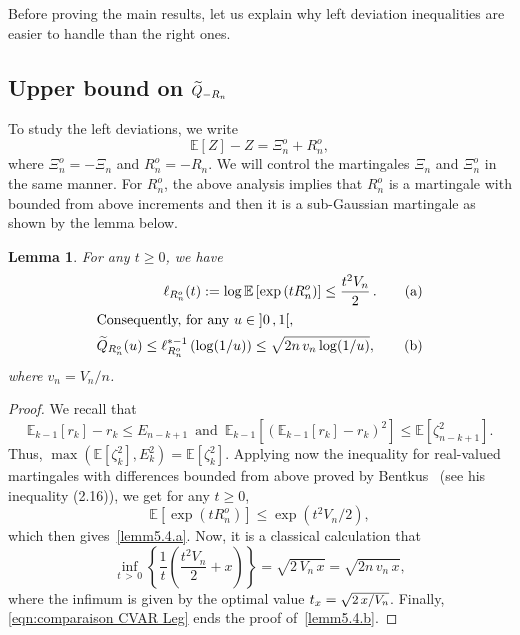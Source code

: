 \documentclass[10pt]{amsart}
\newtheorem{lemm}[theo]{Lemma}\newtheorem{prop}[theo]{Proposition}\newtheorem{coro}[theo]{Corollary}\newtheorem{conj}[theo]{Conjecture}
\theoremstyle{definition}\newtheorem{defi}[theo]{Definition}\newtheorem{rema}[theo]{Remark}\newtheorem{exam}[theo]{Example}\newtheorem{exem}[theo]{Example}\newtheorem{nota}[theo]{Notation}
\newcommand{\bE}{\mathbb{E}}
\newcommand{\intervalleoo}[2]{\mathopen{]} #1\mathclose{}\mathpunct{},#2\mathclose{[}}
\let\oldtilde\tilde
\renewcommand*{\tilde}[1]{\mathchoice{\widetilde{#1}}{\widetilde{#1}}{\oldtilde{#1}}{\oldtilde{#1}}}
\begin{document}
Before proving the main results, let us explain why left deviation inequalities are easier to handle than the right ones.

\subsection{Upper bound on \texorpdfstring{$\tilde Q_{-R_n}$}{}}

To study the left deviations, we write
\begin{equation}\label{eqn:decomposition martingale}
\bE[Z]-Z=\Xi_n^o +R_n^o,
\end{equation}
where $\Xi_n^o=-\Xi_n$ and $R_n^o=-R_n$. We will control the martingales $\Xi_n$ and $\Xi_n^o$ in the same manner. For $R_n^o$, the above analysis implies that $R_n^o$ is a martingale with bounded from above increments and then it is a sub-Gaussian martingale as shown by the lemma below.

\begin{lemm}\label{lem:bound log-laplace R_n}
For any $t\geq 0$, we have
\begin{align}
\ell_{R_n^o}(t):=\log\bE\left[\exp\left(tR_n^o\right)\right]\leq \frac{t^2V_n}{2}\,.\tag{$\rm a$}\label{lemm5.4.a}
\\
\intertext{Consequently, for any $u\in \intervalleoo 01$,}
\tilde Q_{R_n^o}(u)\leq \ell_{R_n^o}^{*-1}\left(\log(1/u)\right)\leq \sqrt{2n\,v_n\log(1/u)},\tag{$\rm b$}\label{lemm5.4.b}
\end{align}
where $v_n=V_n/n$.
\end{lemm}


\begin{proof}
We recall that
\begin{equation}\label{eqn:proof lemma R_n eqn1}
\bE_{k-1}[r_k]-r_k\leq E_{n-k+1}\,\text{ and }\, \bE_{k-1}\left[\left(\bE_{k-1}[r_k]-r_k\right)^2\right]\leq \bE\left[\zeta_{n-k+1}^2\right].
\end{equation}
Thus, $\max(\bE[\zeta_k^2],E_k^2)=\bE[\zeta_k^2]$. Applying now the inequality for real-valued martingales with differences bounded from above proved by Bentkus~\cite{Bentkus03} (see his inequality (2.16)), we get for any $t\geq 0$,
\begin{equation}\label{eqn:proof lemma R_n eqn3}
\bE\left[\exp\left(tR_n^o\right)\right]\leq \exp\left(t^2V_n/2\right),
\end{equation}
which then gives~\eqref{lemm5.4.a}. Now, it is a classical calculation that
\begin{equation}
\inf_{t\,>\,0}\left\{\frac 1t \left(\frac{t^2V_n}{2}+x\right)\right\}=\sqrt{2\,V_n\,x}=\sqrt{2n\,v_n\,x},
\end{equation}
where the infimum is given by the optimal value $t_x=\sqrt{\text{\small{$2\,x/V_n$}}}$. Finally, \eqref{eqn:comparaison CVAR Leg} ends the proof of~\eqref{lemm5.4.b}.
\end{proof}
\end{document}
